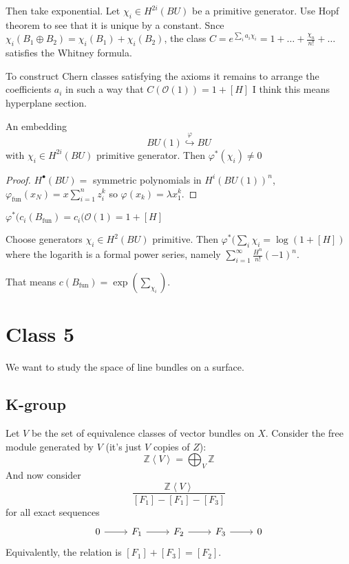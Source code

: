 \begin{remark}
Then take exponential. Let $\chi_i\in H^{2i}(BU)$ be a primitive generator. Use Hopf theorem to see that it is unique by a constant. Snce $\chi_i(B_1\oplus B_2)=\chi_i(B_1)+\chi_i(B_2)$, the class $C=e^{\sum_{i}a_i\chi_i}=1+\ldots+\frac{\chi_n}{n!}+\ldots$ satisfies the Whitney formula.

To construct Chern classes satisfying the axioms it remains to arrange the coefficients $a_i$ in such a way that $C(\mathcal{O}(1))=1+[H]$ I think this means hyperplane section.
\end{remark}

\begin{lemma}
An embedding
	\[BU(1)\overset{\varphi}{\hookrightarrow}BU\]
	with $\chi_i\in H^{2i}(BU)$ primitive generator. Then $\varphi^*(\chi_i)\neq 0$
\end{lemma}

\begin{proof}
	$H^{\bullet}(BU)=$ symmetric polynomials in $H^{i}(BU(1))^n$, $\varphi_{\operatorname{fun}}(x_N)=x\sum_{i=1}^nz_i^k$ so $\varphi (x_k)=\lambda x_1^k$.
\end{proof}

\begin{remark}
	$\varphi^* (c_i(B_{\operatorname{fun}})=c_i(\mathcal{O}(1)=1+[H]$
\end{remark}

\begin{thm}
	Choose generators $\chi_i\in H^{2}(BU)$ primitive. Then $\varphi^* (\sum_{i}\chi_i=\log(1+[H])$ where the logarith is a formal power series, namely $\sum_{i=1}^\infty\frac{H^n}{n!}(-1)^n$.

	That means $c(B_{\operatorname{fun}})=\operatorname{exp}\left(\sum_{\chi_i}\right)$.
\end{thm}
	
	
\section{Class 5}

We want to study the space of line bundles on a surface.

\subsection{K-group}

\begin{defn}
	Let $V$ be the set of equivalence classes of vector bundles on $X$. Consider the free module generated by $V$ (it's just $V$ copies of $Z$):
	\[\mathbb{Z}\left<V\right> =\bigoplus_{V} \mathbb{Z} \]
	And now consider
	\[\frac{\mathbb{Z}\left<V\right> }{[F_1]-[F_1]-[F_3]}\]
	for all exact sequences
	\[\begin{tikzcd}
		0\arrow[r]&F_1\arrow[r]&F_2\arrow[r]&F_3\arrow[r]&0
	\end{tikzcd}\]
	Equivalently, the relation is $[F_1]+[F_3]=[F_2]$.
\end{defn}

